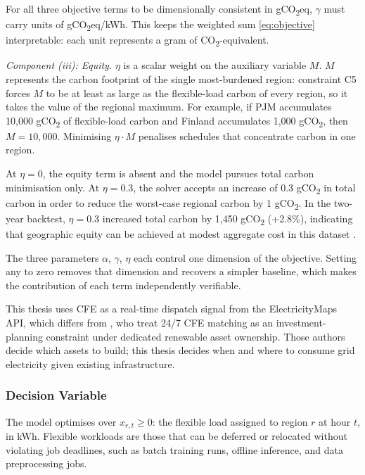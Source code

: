 \documentclass[11pt, a4paper]{article}
\begin{document}
For all three objective terms to be dimensionally consistent in gCO\textsubscript{2}eq, $\gamma$ must carry units of gCO\textsubscript{2}eq/kWh. This keeps the weighted sum \eqref{eq:objective} interpretable: each unit represents a gram of CO\textsubscript{2}-equivalent.

\textit{Component (iii): Equity.}
$\eta$ is a scalar weight on the auxiliary variable $M$. $M$ represents the carbon footprint of the single most-burdened region: constraint C5 forces $M$ to be at least as large as the flexible-load carbon of every region, so it takes the value of the regional maximum. For example, if PJM accumulates 10{,}000 gCO\textsubscript{2} of flexible-load carbon and Finland accumulates 1{,}000 gCO\textsubscript{2}, then $M = 10{,}000$. Minimising $\eta \cdot M$ penalises schedules that concentrate carbon in one region.

At $\eta = 0$, the equity term is absent and the model pursues total carbon minimisation only. At $\eta = 0.3$, the solver accepts an increase of 0.3 gCO\textsubscript{2} in total carbon in order to reduce the worst-case regional carbon by 1 gCO\textsubscript{2}. In the two-year backtest, $\eta = 0.3$ increased total carbon by 1{,}450 gCO\textsubscript{2} (+2.8\%), indicating that geographic equity can be achieved at modest aggregate cost in this dataset \citep{li2024equitable}.

The three parameters $\alpha$, $\gamma$, $\eta$ each control one dimension of the objective. Setting any to zero removes that dimension and recovers a simpler baseline, which makes the contribution of each term independently verifiable.

This thesis uses CFE as a real-time dispatch signal from the ElectricityMaps API, which differs from \citet{riepin2024spatiotemporal}, who treat 24/7 CFE matching as an investment-planning constraint under dedicated renewable asset ownership. Those authors decide which assets to build; this thesis decides when and where to consume grid electricity given existing infrastructure.

\subsubsection{Decision Variable}

The model optimises over $x_{r,t} \geq 0$: the flexible load assigned to region $r$ at hour $t$, in kWh. Flexible workloads are those that can be deferred or relocated without violating job deadlines, such as batch training runs, offline inference, and data preprocessing jobs.
\end{document}
